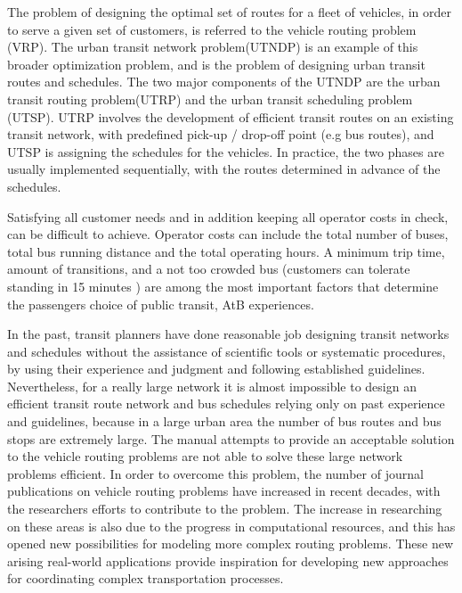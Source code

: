 The problem of designing the optimal set of routes for a fleet of vehicles, in order to serve a given set of customers, is referred to the vehicle routing problem (VRP). The urban transit network problem(UTNDP) is an example of this broader optimization problem, and is the problem of designing urban transit routes and schedules. The two major components of the UTNDP are the urban transit routing problem(UTRP) and the urban transit scheduling problem (UTSP). UTRP involves the development of efficient transit routes on an existing transit network, with predefined pick-up / drop-off point (e.g bus routes), and UTSP is assigning the schedules for the vehicles. In practice, the two phases are usually implemented sequentially, with the routes determined in advance of the schedules.%

Satisfying all customer needs and in addition keeping all operator costs in check, can be difficult to achieve. Operator costs can include the total number of buses, total bus running distance and the total operating hours. A minimum trip time, amount of transitions, and a not too crowded bus (customers can tolerate standing in 15 minutes ) are among the most important factors that determine the passengers choice of public transit, AtB experiences. 

In the past, transit planners have done reasonable job designing transit networks and schedules without the assistance of scientific tools or systematic procedures, by using their experience and judgment and following established guidelines. Nevertheless, for a really large network it is almost impossible to design an efficient transit route network and bus schedules relying only on past experience and guidelines, because in a large urban area the number of bus routes and bus stops are extremely large. The manual attempts to provide an acceptable solution to the vehicle routing problems are not able to solve these large network problems efficient. In order to overcome this problem, the number of journal publications on vehicle routing problems have increased in recent decades, with the researchers efforts to contribute to the problem.  The increase in researching on these areas is also due to the progress in computational resources, and this has opened new possibilities for modeling more complex routing problems. These new arising real-world applications provide inspiration for developing new approaches for coordinating complex transportation processes. %

